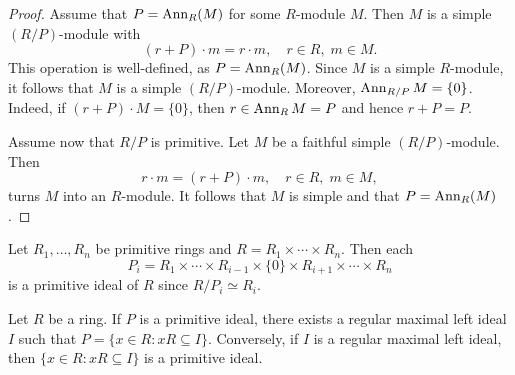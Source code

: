 \begin{proof}
	Assume that $P=\operatorname{Ann}_R(M)$ for some $R$-module $M$. Then $M$ is a simple 
	$(R/P)$-module with 
	\[
	(r+P)\cdot m=r\cdot m,\quad r\in R,\;m\in M. 
	\]
	This operation 
	is well-defined, as 
	$P=\operatorname{Ann}_R(M)$. Since $M$ is a simple $R$-module, it follows that $M$ is 
	a simple $(R/P)$-module. Moreover, $\operatorname{Ann}_{R/P}M=\{0\}$. Indeed, if 
	$(r+P)\cdot M=\{0\}$, then $r\in\operatorname{Ann}_RM=P$ and hence $r+P=P$.

	Assume now that $R/P$ is primitive. Let $M$ be a faithful simple $(R/P)$-module. 
	Then 
    \[
    r\cdot m=(r+P)\cdot m, \quad r\in R,\; m\in M,
    \]
    turns $M$ into an $R$-module. It follows that $M$ is simple and that $P=\operatorname{Ann}_R(M)$. 
\end{proof}



\begin{example}
	Let $R_1,\dots,R_n$ be primitive rings and $R=R_1\times\cdots\times
	R_n$. Then each 
    \[
    P_i=R_1\times\cdots\times R_{i-1}\times\{0\}\times
	R_{i+1}\times\cdots\times R_n
    \]
    is a primitive ideal of $R$ since 
	$R/P_i\simeq R_i$.
\end{example}

%

\begin{lemma}
	\label{lemma:maxprim}
	Let $R$ be a ring. If $P$ is a primitive ideal, there exists a regular 
        maximal left ideal $I$ such that $P=\{x\in R:xR\subseteq I\}$.
	Conversely, if $I$ is a regular maximal left ideal, then 
	$\{x\in R:xR\subseteq I\}$ is a primitive ideal. 
\end{lemma}

